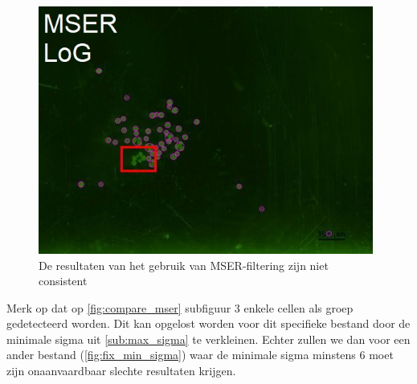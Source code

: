 \documentclass{article}
\begin{document}
\begin{multicols}{2}
\begin{figure}[H]
\includegraphics[width=0.98\textwidth]{images/log_mser_bad.JPG}
\caption{\label{fig:compare_mser}De resultaten van het gebruik van MSER-filtering zijn niet consistent}
\end{figure}

Merk op dat op \autoref{fig:compare_mser} subfiguur 3 enkele cellen als groep gedetecteerd worden. Dit kan opgelost worden voor dit specifieke bestand door de minimale sigma uit \autoref{sub:max_sigma} te verkleinen. Echter zullen we dan voor een ander bestand (\autoref{fig:fix_min_sigma}) waar de minimale sigma minstens 6 moet zijn onaanvaardbaar slechte resultaten krijgen.


\end{multicols}
\end{document}
